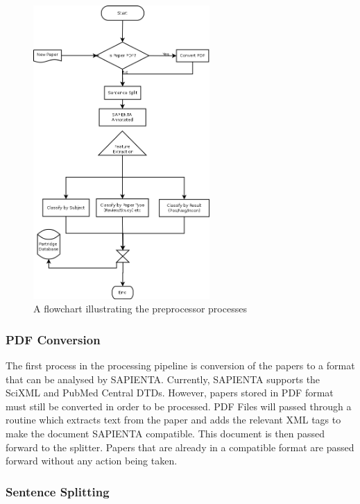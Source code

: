 \begin{figure}[!h]
\centering
\includegraphics[width=0.6\textwidth]{images/design/flow_preprocessor.png}
\caption{A flowchart illustrating the preprocessor processes}
\label{fig:flow_preprocessor}
\end{figure}

\subsubsection{PDF Conversion}

The first process in the processing pipeline is conversion of the papers to a
format that can be analysed by SAPIENTA. Currently, SAPIENTA supports the
SciXML\cite{rupp2006flexible} and PubMed Central\cite{pubmedDTD} DTDs. However,
papers stored in PDF format must still be converted in order to be processed.
PDF Files will passed through a routine which extracts text from the paper and
adds the relevant XML tags to make the document SAPIENTA compatible. This
document is then passed forward to the splitter. Papers that are already in a
compatible format are passed forward without any action being taken.

\subsubsection{Sentence Splitting} 

